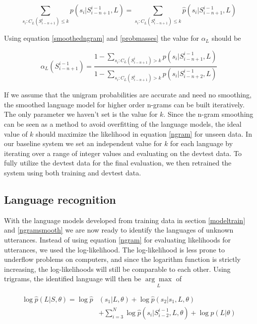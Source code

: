 \begin{equation}\label{probmasses}
\sum_{s_i:C_L(S_{i-n+1}^i)\leq k}p(s_i|S_{i-n+1}^{i-1}, L)
 = 
\sum_{s_i:C_L(S_{i-n+1}^i)\leq k} \hat{p}(s_i|S_{i-n+1}^{i-1}, L)
\end{equation}

Using equation \ref{smoothedngram} and \ref{probmasses} the value for $\alpha_L$ should be

\begin{equation}\label{alpha}
\alpha_L(S_{i-n+1}^{i-1})=
\frac{1-\sum_{s_i:C_L(S_{i-n+1}^i)>k} p(s_i|S_{i-n+1}^{i-1}, L)}{
1-\sum_{s_i:C_L(S_{i-n+1}^i)>k} p(s_i|S_{i-n+2}^{i-1}, L)}
\end{equation}

If we assume that the unigram probabilities are accurate and need no smoothing, the smoothed language model for higher order n-grams can be built iteratively. The only parameter we haven't set is the value for $k$. Since the n-gram smoothing can be seen as a method to avoid overfitting of the language models, the ideal value of $k$ should maximize the likelihood in equation \ref{ngram} for unseen data. In our baseline system we set an independent value for $k$ for each language by iterating over a range of integer values and evaluating on the devtest data. To fully utilize the devtest data for the final evaluation, we then retrained the system using both training and devtest data.

\subsection{Language recognition}

With the language models developed from training data in section \ref{modeltrain} and \ref{ngramsmooth} we are now ready to identify the languages of unknown utterances. Instead of using equation \ref{ngram} for evaluating likelihoods for utterances, we used the log-likelihood. The log-likelihood is less prone to underflow problems on computers, and since the logarithm function is strictly increasing, the log-likelihoods will still be comparable to each other. Using trigrams, the identified language will then be $\underset{L}{\arg \max}$ of

\begin{align}\label{langlogmaxlike}
\log\hat{p}(L|S, \theta)=\log \hat{p}&(s_1 | L, \theta)+\log\hat{p}(s_2 | s_1, L, \theta) \nonumber \\
&+\sum_{i=3}^N \log\hat{p}(s_i | S_{i-2}^{i-1}, L, \theta)+\log p(L|\theta)
\end{align}

